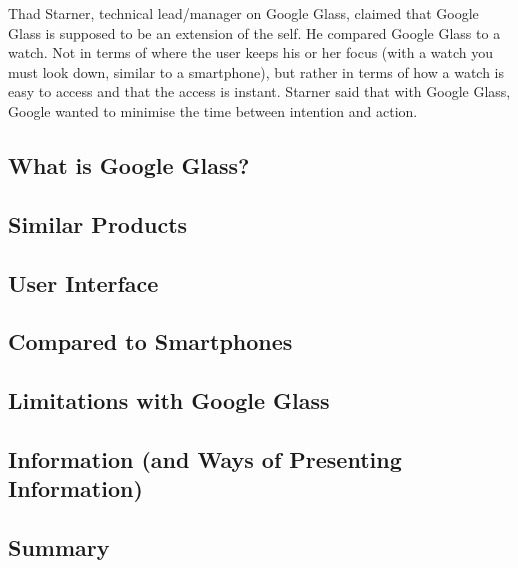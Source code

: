 Thad Starner, technical lead/manager on Google Glass, claimed that Google Glass is supposed to be an extension of the self.\cite{6504855} He compared Google Glass to a watch. Not in terms of where the user keeps his or her focus (with a watch you must look down, similar to a smartphone), but rather in terms of how a watch is easy to access and that the access is instant. Starner said that with Google Glass, Google wanted to minimise the time between intention and action. 


\subsection{What is Google Glass?}
\label{subsec:googleglass}


\subsection{Similar Products}
\label{subsec:similarproducts}


\subsection{User Interface}
\label{subsec:userinterface}


\subsection{Compared to Smartphones}
\label{comparedtophones}


\subsection{Limitations with Google Glass}
\label{subsec:limitations}


\subsection{Information (and Ways of Presenting Information)}
\label{subsec:information}


\subsection{Summary}
\label{subsec:summary}



